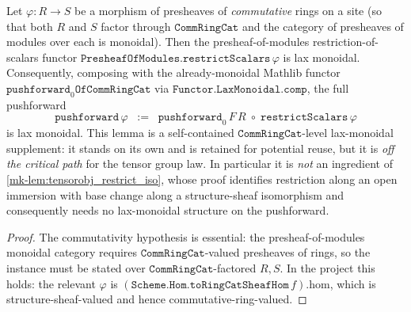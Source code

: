 \begin{lemma}\label{mk-lem:restrictscalars_laxmonoidal}
  \leanok

  Let \(\varphi : R \to S\) be a morphism of presheaves of \emph{commutative}
  rings on a site (so that both \(R\) and \(S\) factor through
  \(\mathtt{CommRingCat}\) and the category of presheaves of modules over each
  is monoidal). Then the presheaf-of-modules restriction-of-scalars functor
  \(\mathtt{PresheafOfModules.restrictScalars}\,\varphi\) is lax monoidal.
  Consequently, composing with the already-monoidal Mathlib functor
  \(\mathtt{pushforward}_0\mathtt{OfCommRingCat}\) via
  \(\mathtt{Functor.LaxMonoidal.comp}\), the full pushforward
  \[
    \mathtt{pushforward}\,\varphi
      \;\;:=\;\;
    \mathtt{pushforward}_0\,F\,R \;\circ\; \mathtt{restrictScalars}\,\varphi
  \]
  is lax monoidal. This lemma is a self-contained
  \(\mathtt{CommRingCat}\)-level lax-monoidal supplement: it stands on its own
  and is retained for potential reuse, but it is \emph{off the critical path}
  for the tensor group law. In particular it is \emph{not} an ingredient of
  \ref{mk-lem:tensorobj_restrict_iso}, whose proof identifies restriction along an
  open immersion with base change along a structure-sheaf isomorphism and
  consequently needs no lax-monoidal structure on the pushforward.
\end{lemma}

\begin{proof}
  \leanok

  The commutativity hypothesis is essential: the presheaf-of-modules monoidal
  category requires \(\mathtt{CommRingCat}\)-valued presheaves of rings, so the
  instance must be stated over \(\mathtt{CommRingCat}\)-factored \(R, S\). In
  the project this holds: the relevant \(\varphi\) is
  \((\mathtt{Scheme.Hom.toRingCatSheafHom}\,f).\mathrm{hom}\), which is
  structure-sheaf-valued and hence commutative-ring-valued.
\end{proof}

